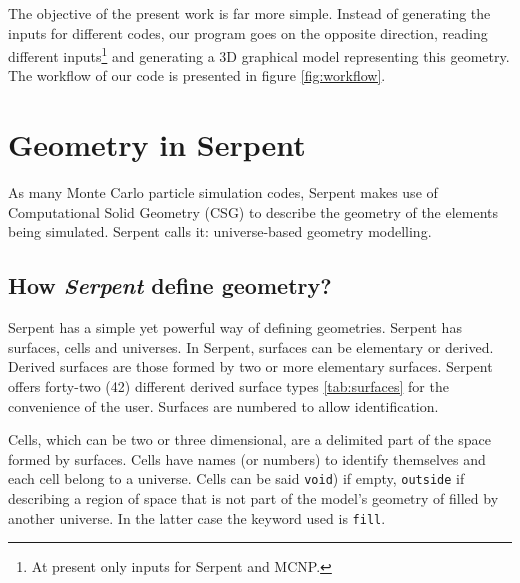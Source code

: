 \documentclass{elsarticle}
\begin{document}
The objective of the present work is far more simple. Instead of generating the inputs for
different codes, our program goes on the opposite direction, reading different
inputs\footnote{At present only inputs for Serpent and MCNP.} and generating
a 3D graphical model representing this geometry. The workflow of our code is presented
in figure \ref{fig:workflow}.

\section{Geometry in Serpent}

As many Monte Carlo particle simulation codes, Serpent makes use of Computational Solid Geometry (CSG) to
describe the geometry of the elements being simulated. Serpent calls it: universe-based geometry modelling.



\subsection{How \textit{Serpent} define geometry?}

Serpent has a simple yet powerful way of defining geometries. Serpent has 
surfaces, cells and universes. In Serpent, surfaces can be elementary or 
derived. Derived surfaces are those formed by two or more elementary surfaces. 
Serpent offers forty-two (42) different derived surface types \ref{tab:surfaces} for the convenience of the user. Surfaces are numbered to allow identification.

Cells, which can be two or three dimensional, are a delimited part of the space 
formed by surfaces. Cells have names (or numbers) to identify themselves and 
each cell belong to a universe. Cells can be said \texttt{void}) if 
empty, \texttt{outside} if describing a region of space that is not part 
of the model's geometry of filled by another universe. In the latter case the 
keyword used is \texttt{fill}.
\end{document}
